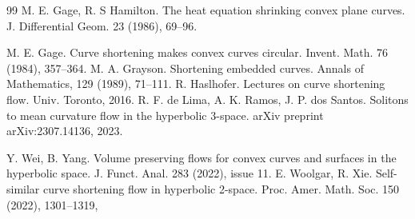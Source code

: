 \documentclass[12pt]{amsart}
\theoremstyle{plain}
\theoremstyle{definition}
\begin{document}
\begin{thebibliography}{99}
 M. E. Gage, R. S Hamilton. The heat equation shrinking convex plane curves. J.    Differential Geom.  23 (1986), 69--96.

 M. E. Gage. Curve shortening makes convex curves circular. Invent. Math. 76 (1984), 357--364.
 M. A.   Grayson. Shortening embedded curves. Annals of Mathematics, 129 (1989), 71--111.
 R. Haslhofer. Lectures on curve shortening flow. Univ. Toronto, 2016.
 R. F. de Lima, A. K. Ramos, J. P. dos Santos. Solitons to mean curvature flow in the hyperbolic $3$-space. arXiv preprint arXiv:2307.14136, 2023.

 Y. Wei, B.  Yang. Volume preserving flows for convex curves and surfaces in the hyperbolic space.
J. Funct. Anal. 283 (2022), issue 11.  
 E. Woolgar, R. Xie. Self-similar curve shortening flow in hyperbolic 2-space. Proc. Amer. Math. Soc.   150 (2022), 1301--1319,
 

\end{thebibliography}
\end{document}
